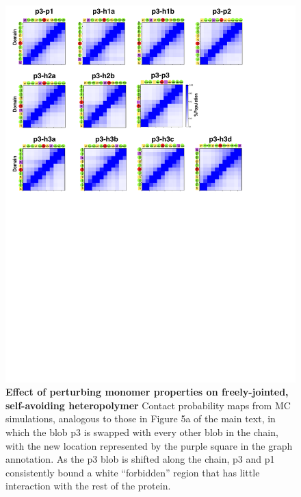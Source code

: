 \documentclass[10pt,letterpaper]{article}
\begin{document}
\begin{figure}[!ht]
\includegraphics[scale=0.5,width=\textwidth,trim={0 0cm 0 0cm},clip]{./figures/S4.pdf}
\caption{{\bf Effect of perturbing monomer properties on freely-jointed, self-avoiding heteropolymer} Contact probability maps from MC simulations, analogous to those in Figure 5a of the main text, in which the blob p3 is swapped with every other blob in the chain, with the new location represented by the purple square in the graph annotation.  As the p3 blob is shifted along the chain, p3 and p1 consistently bound a white ``forbidden'' region that has little interaction with the rest of the protein. }
\label{S4} 
\end{figure}
\end{document}
